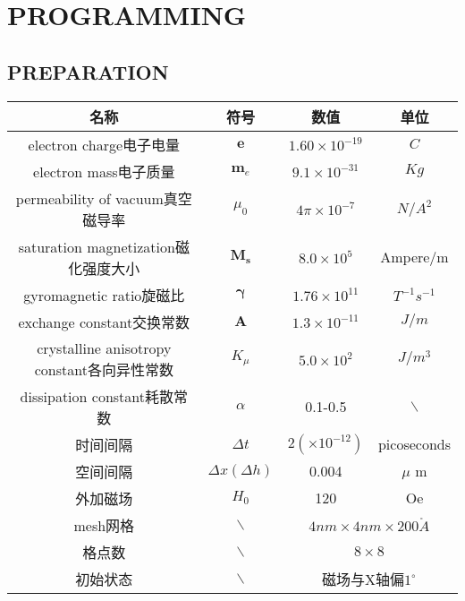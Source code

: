 \documentclass{article}
\begin{document}
\section{PROGRAMMING}
\subsection{PREPARATION}
\begin{table}
\centering
\begin{tabular}{cccc}

\toprule

名称&符号&数值&单位\\

\midrule


electron charge电子电量&$\bm{e}$ &$1.60\times10^{-19}$ &${C}$\\

electron mass电子质量&$\bm{m}_{e}$ &$9.1\times10^{-31}$ & ${Kg}$\\

permeability of vacuum真空磁导率&$\mu_0$&$4\pi \times 10^{-7}$&$N/A^2$\\

saturation magnetization磁化强度大小&$\bm{M_s}$& $8.0 \times 10^5$& Ampere/m\\

gyromagnetic ratio旋磁比&$\bm{\gamma}$



&$1.76\times 10^{11}$ & $T^{-1}s^{-1}$\\

exchange constant交换常数&$\bm{A}$& $1.3\times 10^{-11}$& $J/m$\\

crystalline anisotropy constant各向异性常数&$K_{\mu}$&$5.0 \times 10^2$&$J/m^3$\\

dissipation constant耗散常数& $\alpha$ & 0.1-0.5 & $ \backslash $ \\

时间间隔&$\Delta t$& $2\left(\times 10^{-12}\right)$ & picoseconds \\

空间间隔&$\Delta x \left(\Delta h\right)$&0.004&$\mu$ m\\

外加磁场& $H_0$ & 120 &Oe\\

mesh网格&$\backslash$&\multicolumn{2}{c}{$4 nm \times 4 nm  \times 200\mathring{A}$}\\

格点数&$\backslash$&\multicolumn{2}{c}{$8 \times 8$}\\

初始状态&$\backslash$&\multicolumn{2}{c}{磁场与X轴偏$1^{\circ}$}\\

\bottomrule

\end{tabular}
\end{table}
\end{document}
